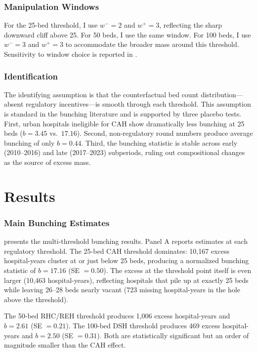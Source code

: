 \documentclass[12pt]{article}
\begin{document}
\subsubsection*{Manipulation Windows} For the 25-bed threshold, I use $w^{-} = 2$ and $w^{+} = 3$, reflecting the sharp downward cliff above 25. For 50 beds, I use the same window. For 100 beds, I use $w^{-} = 3$ and $w^{+} = 3$ to accommodate the broader mass around this threshold. Sensitivity to window choice is reported in .

\subsubsection*{Identification} The identifying assumption is that the counterfactual bed count distribution---absent regulatory incentives---is smooth through each threshold. This assumption is standard in the bunching literature \citep{Kleven2016, ChettyFriedmanSaez2013} and is supported by three placebo tests. First, urban hospitals ineligible for CAH show dramatically less bunching at 25 beds ($b = 3.45$ vs.\ $17.16$). Second, non-regulatory round numbers produce average bunching of only $b = 0.44$. Third, the bunching statistic is stable across early (2010--2016) and late (2017--2023) subperiods, ruling out compositional changes as the source of excess mass.

\section{Results}



\subsubsection*{Main Bunching Estimates}  presents the multi-threshold bunching results. Panel A reports estimates at each regulatory threshold. The 25-bed CAH threshold dominates: 10,167 excess hospital-years cluster at or just below 25 beds, producing a normalized bunching statistic of $b = 17.16$ (SE $= 0.50$). The excess at the threshold point itself is even larger (10,463 hospital-years), reflecting hospitals that pile up at exactly 25 beds while leaving 26--28 beds nearly vacant (723 missing hospital-years in the hole above the threshold).

The 50-bed RHC/REH threshold produces 1,006 excess hospital-years and $b = 2.61$ (SE $= 0.21$). The 100-bed DSH threshold produces 469 excess hospital-years and $b = 2.50$ (SE $= 0.31$). Both are statistically significant but an order of magnitude smaller than the CAH effect.
\end{document}
